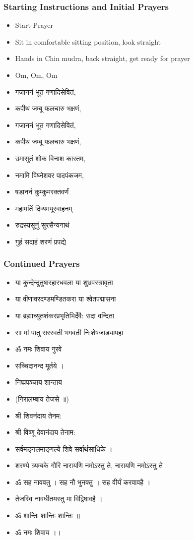 \begin{frame}[fragile]\frametitle{Starting Instructions and Initial Prayers}
\begin{itemize}
    \item Start Prayer
    \item Sit in comfortable sitting position, look straight
    \item Hands in Chin mudra, back straight, get ready for prayer
    \item Om, Om, Om
    \item गजाननं भूत गणादिसेवितं,
    \item कपीथ जम्बू फलचारु भक्षणं,
    \item गजाननं भूत गणादिसेवितं,
    \item कपीथ जम्बू फलचारु भक्षणं,
    \item उमासुतं शोक विनाश कारतम,
    \item नमामि विघ्नेशवर पादपंकजम,
    \item षडाननं कुम्कुमरक्तवर्णं
    \item महामतिं दिव्यमयूरवाहनम्
    \item रुद्रस्यसूनुं सुरसैन्यनाथं
    \item गुहं सदाहं शरणं प्रपद्ये
\end{itemize}
\end{frame}

\begin{frame}[fragile]\frametitle{Continued Prayers}
\begin{itemize}
    \item या कुन्देन्दुतुषारहारधवला या शुभ्रवस्त्रावृता
    \item या वीणावरदण्डमण्डितकरा या श्वेतपद्मासना
    \item या ब्रह्माच्युतशंकरप्रभृतिभिर्देवै: सदा वन्दिता
    \item सा मां पातु सरस्वती भगवती नि:शेषजाड्यापहा
    \item ॐ नमः शिवाय गुरवे
    \item सच्चिदानन्द मूर्तये ।
    \item निष्प्रपञ्चाय शान्ताय
    \item (निरालम्बाय तेजसे ॥) 
    \item श्री शिवनंदाय तेनम:
    \item श्री विष्णू देवानंदाय तेनाम:
    \item सर्वमङ्गलमाङ्गल्ये शिवे सर्वार्थसाधिके ।
    \item शरण्ये त्र्यम्बके गौरि नारायणि नमोऽस्तु ते, नारायणि नमोऽस्तु ते
    \item ॐ सह नाववतु । सह नौ भुनक्तु । सह वीर्यं करवावहै ।
    \item तेजस्वि नावधीतमस्तु मा विद्विषावहै ।
    \item ॐ शान्तिः शान्तिः शान्तिः ॥
    \item ॐ नमः शिवाय ।।
\end{itemize}
\end{frame}

